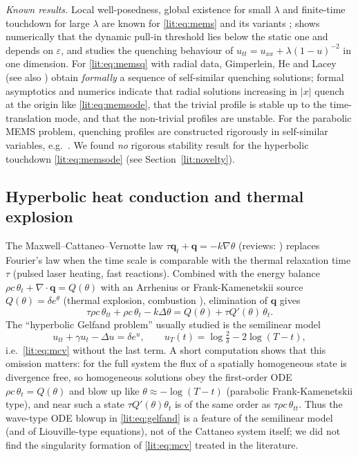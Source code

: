\emph{Known results.} Local well-posedness, global existence for small
$\lambda$ and finite-time touchdown for large $\lambda$ are known for
\eqref{lit:eq:mems} and its variants
\cite{ChangLevine1981,FloresEtAl2007,Guo2010,KavallarisEtAl2011,Flores2014,KavallarisEtAl2015,Miyasita2017};
\cite{Flores2014} shows numerically that the dynamic pull-in threshold lies
below the static one and depends on $\varepsilon$, and
\cite{KavallarisEtAl2015} studies the quenching behaviour of
$u_{tt}=u_{xx}+\lambda(1-u)^{-2}$ in one dimension. For
\eqref{lit:eq:memsq} with radial data, Gimperlein, He and Lacey
\cite{GimperleinHeLacey2022} (see also \cite{He2021}) obtain
\emph{formally} a sequence of self-similar quenching solutions; formal
asymptotics and numerics indicate that radial solutions increasing in $|x|$
quench at the origin like \eqref{lit:eq:memsode}, that the trivial profile
is stable up to the time-translation mode, and that the non-trivial
profiles are unstable. For the parabolic MEMS problem, quenching profiles
are constructed rigorously in self-similar variables, e.g.\
\cite{LiaoNguyen2025}. We found \emph{no} rigorous stability result for the
hyperbolic touchdown \eqref{lit:eq:memsode} (see
Section~\ref{lit:novelty}).

\subsection{Hyperbolic heat conduction and thermal explosion}
\label{lit:heat}
The Maxwell--Cattaneo--Vernotte law $\tau\boldsymbol q_t+\boldsymbol
q=-k\nabla\theta$ \cite{Cattaneo1958,Vernotte1958} (reviews:
\cite{JosephPreziosi1989,Straughan2011}) replaces Fourier's law when the
time scale is comparable with the thermal relaxation time $\tau$ (pulsed
laser heating, fast reactions). Combined with the energy balance $\rho
c\,\theta_t+\nabla\!\cdot\boldsymbol q=Q(\theta)$ with an Arrhenius or
Frank-Kamenetskii source $Q(\theta)=\delta e^{\theta}$ (thermal explosion,
combustion \cite{BebernesEberly1989}), elimination of $\boldsymbol q$ gives
\begin{equation}\label{lit:eq:mcv}
  \tau\rho c\,\theta_{tt}+\rho c\,\theta_t-k\Delta\theta
  =Q(\theta)+\tau Q'(\theta)\,\theta_t .
\end{equation}
The ``hyperbolic Gelfand problem'' usually studied is the semilinear model
\begin{equation}\label{lit:eq:gelfand}
  u_{tt}+\gamma u_t-\Delta u=\delta e^{u},\qquad
  u_T(t)=\log\tfrac{2}{\delta}-2\log(T-t),
\end{equation}
i.e.\ \eqref{lit:eq:mcv} without the last term. A short computation shows
that this omission matters: for the full system the flux of a spatially
homogeneous state is divergence free, so homogeneous solutions obey the
first-order ODE $\rho c\,\theta_t=Q(\theta)$ and blow up like
$\theta\approx-\log(T-t)$ (parabolic Frank-Kamenetskii type), and near such
a state $\tau Q'(\theta)\theta_t$ is of the same order as
$\tau\rho c\,\theta_{tt}$. Thus the wave-type ODE blowup in
\eqref{lit:eq:gelfand} is a feature of the semilinear model (and of
Liouville-type equations), not of the Cattaneo system itself; we did not
find the singularity formation of \eqref{lit:eq:mcv} treated in the
literature.

